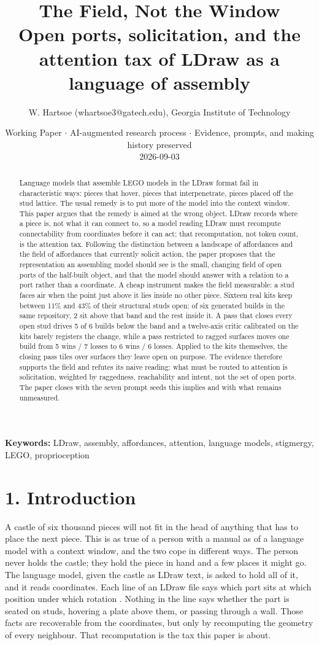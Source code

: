 \documentclass[11pt,a4paper]{article}
\title{The Field, Not the Window\\\large Open ports, solicitation, and the attention tax of LDraw as a language of assembly}
\author{W. Hartsoe (whartsoe3@gatech.edu), Georgia Institute of Technology}
\date{Working Paper $\cdot$ AI-augmented research process $\cdot$ Evidence, prompts, and making history preserved\\2026-09-03}
\begin{document}
\maketitle
\begin{abstract}Language models that assemble LEGO models in the LDraw format fail in characteristic ways: pieces that hover, pieces that interpenetrate, pieces placed off the stud lattice. The usual remedy is to put more of the model into the context window. This paper argues that the remedy is aimed at the wrong object. LDraw records where a piece is, not what it can connect to, so a model reading LDraw must recompute connectability from coordinates before it can act; that recomputation, not token count, is the attention tax. Following the distinction between a landscape of affordances and the field of affordances that currently solicit action, the paper proposes that the representation an assembling model should see is the small, changing field of open ports of the half-built object, and that the model should answer with a relation to a port rather than a coordinate. A cheap instrument makes the field measurable: a stud faces air when the point just above it lies inside no other piece. Sixteen real kits keep between 11\% and 43\% of their structural studs open; of six generated builds in the same repository, 2 sit above that band and the rest inside it. A pass that closes every open stud drives 5 of 6 builds below the band and a twelve-axis critic calibrated on the kits barely registers the change, while a pass restricted to ragged surfaces moves one build from 5 wins / 7 losses to 6 wins / 6 losses. Applied to the kits themselves, the closing pass tiles over surfaces they leave open on purpose. The evidence therefore supports the field and refutes its naive reading: what must be routed to attention is solicitation, weighted by raggedness, reachability and intent, not the set of open ports. The paper closes with the seven prompt seeds this implies and with what remains unmeasured.\end{abstract}
\noindent\textbf{Keywords:} LDraw, assembly, affordances, attention, language models, stigmergy, LEGO, proprioception
\section*{1. Introduction}
A castle of six thousand pieces will not fit in the head of anything that has to place the next piece. This is as true of a person with a manual as of a language model with a context window, and the two cope in different ways. The person never holds the castle; they hold the piece in hand and a few places it might go. The language model, given the castle as LDraw text, is asked to hold all of it, and it reads coordinates. Each line of an LDraw file says which part sits at which position under which rotation \cite{ldrawformatspec}. Nothing in the line says whether the part is seated on studs, hovering a plate above them, or passing through a wall. Those facts are recoverable from the coordinates, but only by recomputing the geometry of every neighbour. That recomputation is the tax this paper is about.
\end{document}
